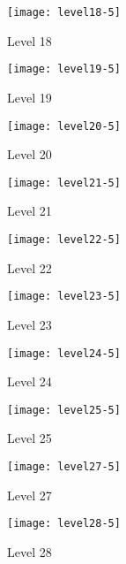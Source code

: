 \begin{figure}
  \centering
  \texttt{[image: level18-5]}
  \caption{Level 18}
  \label{fig:level18-stats}
\end{figure}
 
\begin{figure}
  \centering
  \texttt{[image: level19-5]}
  \caption{Level 19}
  \label{fig:level19-stats}
\end{figure}

\begin{figure}
  \centering
  \texttt{[image: level20-5]}
  \caption{Level 20}
  \label{fig:level20-stats}
\end{figure}

\clearpage
 
\begin{figure}
  \centering
  \texttt{[image: level21-5]}
  \caption{Level 21}
  \label{fig:level21-stats}
\end{figure}

\begin{figure}
  \centering
  \texttt{[image: level22-5]}
  \caption{Level 22}
  \label{fig:level2-stats}
\end{figure}
 
\begin{figure}
  \centering
  \texttt{[image: level23-5]}
  \caption{Level 23}
  \label{fig:level23-stats}
\end{figure}

\begin{figure}
  \centering
  \texttt{[image: level24-5]}
  \caption{Level 24}
  \label{fig:level24-stats}
\end{figure}
 
\begin{figure}
  \centering
  \texttt{[image: level25-5]}
  \caption{Level 25}
  \label{fig:level25-stats}
\end{figure}

\begin{figure}
  \centering
  \texttt{[image: level27-5]}
  \caption{Level 27}
  \label{fig:level27-stats}
\end{figure}
 
\begin{figure}
  \centering
  \texttt{[image: level28-5]}
  \caption{Level 28}
  \label{fig:level28-stats}
\end{figure}

